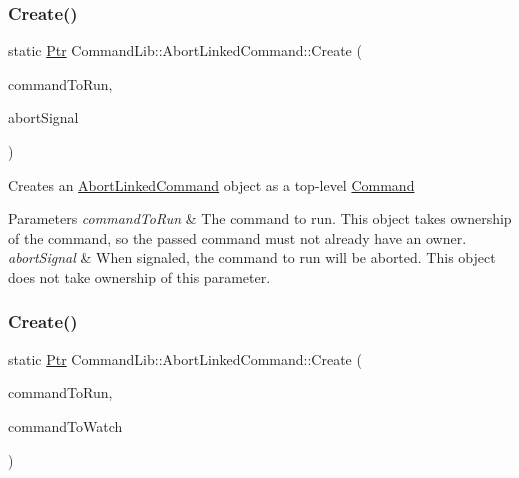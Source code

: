 \subsubsection{\texorpdfstring{Create()}{Create()}\hspace{0.1cm}{\footnotesize\ttfamily [1/2]}}
{\footnotesize\ttfamily static \mbox{\hyperlink{class_command_lib_1_1_abort_linked_command_acb916ab386f796250b4978538d9eabd8}{Ptr}} Command\+Lib\+::\+Abort\+Linked\+Command\+::\+Create (\begin{DoxyParamCaption}\item[{\mbox{\hyperlink{class_command_lib_1_1_command_a3b3e4f00144373299df5c6bb1acc319d}{Command\+::\+Ptr}}}]{command\+To\+Run,  }\item[{\mbox{\hyperlink{class_command_lib_1_1_waitable_ac74b6b91e48220146eada76a31cf2d9b}{Waitable\+::\+Ptr}}}]{abort\+Signal }\end{DoxyParamCaption})\hspace{0.3cm}{\ttfamily [static]}}



Creates an \mbox{\hyperlink{class_command_lib_1_1_abort_linked_command}{Abort\+Linked\+Command}} object as a top-\/level \mbox{\hyperlink{class_command_lib_1_1_command}{Command}} 


\begin{DoxyParams}{Parameters}
{\em command\+To\+Run} & The command to run. This object takes ownership of the command, so the passed command must not already have an owner. \\
\hline
{\em abort\+Signal} & When signaled, the command to run will be aborted. This object does not take ownership of this parameter. \\
\hline
\end{DoxyParams}
\mbox{\label{class_command_lib_1_1_abort_linked_command_ab3f6ae763ac98e85ce485d1cb7286960}} 
\subsubsection{\texorpdfstring{Create()}{Create()}\hspace{0.1cm}{\footnotesize\ttfamily [2/2]}}
{\footnotesize\ttfamily static \mbox{\hyperlink{class_command_lib_1_1_abort_linked_command_acb916ab386f796250b4978538d9eabd8}{Ptr}} Command\+Lib\+::\+Abort\+Linked\+Command\+::\+Create (\begin{DoxyParamCaption}\item[{\mbox{\hyperlink{class_command_lib_1_1_command_a3b3e4f00144373299df5c6bb1acc319d}{Command\+::\+Ptr}}}]{command\+To\+Run,  }\item[{\mbox{\hyperlink{class_command_lib_1_1_command_aee8fd78ff853a1f9c8e56959c3e81811}{Command\+::\+Const\+Ptr}}}]{command\+To\+Watch }\end{DoxyParamCaption})\hspace{0.3cm}{\ttfamily [static]}}



